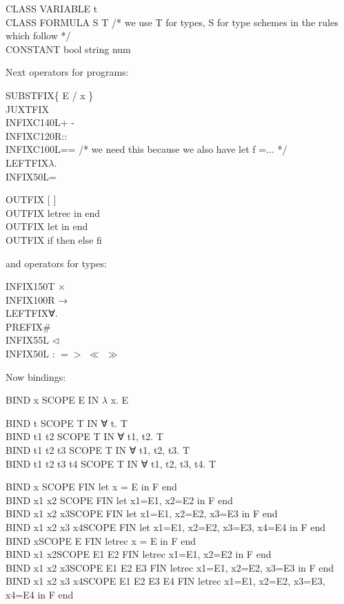 CLASS VARIABLE t\\
CLASS FORMULA S T /* we use T for types, S for type schemes in the rules which follow */\\
CONSTANT bool string num


Next operators for programs:

SUBSTFIX\tab \{ E / x \}\\
JUXTFIX\\
INFIXC\tab 140L\tab + -\\
INFIXC\tab 120R\tab ::\\
INFIXC\tab 100L\tab == /* we need this because we also have let f =... */\\
LEFTFIX\tab $\lambda$.\\
INFIX\tab 50L\tab =

OUTFIX [ ]\\
OUTFIX letrec in end\\
OUTFIX let in end\\
OUTFIX if then else fi


and operators for types:

INFIX\tab 150T \tab $\times$\\
INFIX\tab 100R \tab →\\
LEFTFIX\tab ∀.\\
PREFIX\tab \#\\
INFIX\tab 55L \tab {\textbullet} $\triangleleft$\\
INFIX\tab 50L \tab : $=>$ $\ll$ $\gg$


Now bindings:

BIND x SCOPE E IN $\lambda$ x. E

BIND t SCOPE T IN ∀ t. T\\
BIND t1 t2 SCOPE T IN ∀ t1, t2. T\\
BIND t1 t2 t3 SCOPE T IN ∀ t1, t2, t3. T\\
BIND t1 t2 t3 t4 SCOPE T IN ∀ t1, t2, t3, t4. T

BIND x \tab SCOPE F\tab IN let x = E in F end\\
BIND x1 x2 \tab SCOPE F\tab IN let x1=E1, x2=E2 in F end\\
BIND x1 x2 x3\tab SCOPE F\tab IN let x1=E1, x2=E2, x3=E3 in F end\\
BIND x1 x2 x3 x4\tab SCOPE F\tab IN let x1=E1, x2=E2, x3=E3, x4=E4 in F end\\
BIND x\tab SCOPE E F\tab IN letrec x = E in F end\\
BIND x1 x2\tab SCOPE E1 E2 F\tab IN letrec x1=E1, x2=E2 in F end\\
BIND x1 x2 x3\tab SCOPE E1 E2 E3 F\tab IN letrec x1=E1, x2=E2, x3=E3 in F end\\
BIND x1 x2 x3 x4\tab SCOPE E1 E2 E3 E4 F\tab IN letrec x1=E1, x2=E2, x3=E3, x4=E4 in F end


